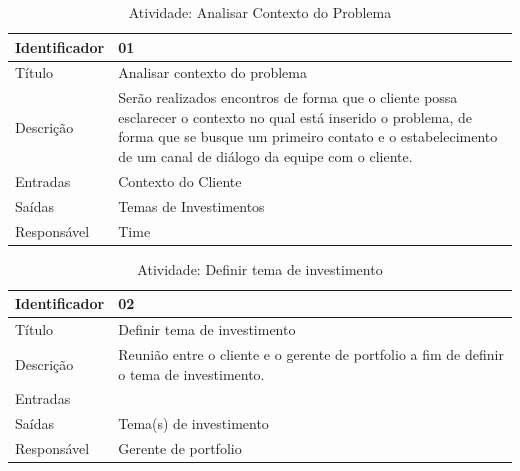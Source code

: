
\begin{table}[!htbp]
\centering
\caption{Atividade: Analisar Contexto do Problema}
\label{atividade:1}
\begin{tabularx}{0.9\textwidth}{|>{}s |b|}
\hline
Identificador & 01                                                                  \\ \hline
Título        & Analisar contexto do problema                                       \\ \hline
Descrição     & Serão realizados encontros de forma que o cliente possa esclarecer o contexto no qual está inserido o problema, de forma que se busque um primeiro contato e o estabelecimento de um canal de diálogo da equipe com o cliente. \\ \hline
Entradas       & Contexto do Cliente                                                  \\ \hline
Saídas         & Temas de Investimentos                                               \\ \hline
Responsável   & Time                                                                  \\ \hline
\end{tabularx}
\end{table}

\begin{table}[!htbp]
\centering
\caption{Atividade: Definir tema de investimento}
\label{atividade:2}
\begin{tabularx}{0.9\textwidth}{|>{}s |b|}
\hline
Identificador & 02                                                                    \\ \hline
Título        & Definir tema de investimento                                          \\ \hline
Descrição     & Reunião entre o cliente e o gerente de portfolio a fim de definir o tema de investimento. \\ \hline
Entradas      &                                                                       \\ \hline
Saídas        & Tema(s) de investimento                                               \\ \hline
Responsável   & Gerente de portfolio                                                  \\ \hline
\end{tabularx}
\end{table}

